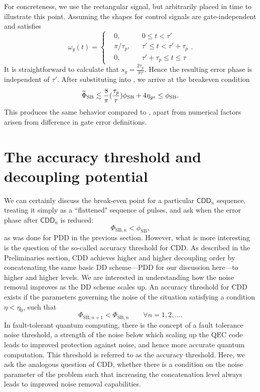 \documentclass[pra,reprint,superscriptaddress]{revtex4-2}
\newcommand{\wt}[1]{\widetilde{#1}}
\newcommand{\CDDn}{\mathsf{CDD}_n}
\begin{document}
For concreteness, we use the rectangular signal, but arbitrarily placed in time to illustrate this point. Assuming the shapes for control signals are gate-independent and satisfies
\begin{equation}
 \omega_g(t)=
 \left\{
 \begin{aligned}
  &0,&& 0\le t<\tau'\\
 &\pi/\tau_p, && \tau'\le t < \tau'+\tau_p\\
 & 0,&& \tau'+\tau_p \le t\le \tau
 \end{aligned}
 \right..
\end{equation}
It is straightforward to calculate that $s_g = \frac{2\tau_p}{\pi\tau}$.
Hence the resulting error phase is independent of $\tau'$.
After substituting into , we arrive at the breakeven condition
\begin{equation}\label{eq:PDD-rect2}
  \wt\Phi_{\rSB}\lesssim \frac{8}{\pi} (\frac{\tau_p}{\tau})\phi_\rSB +  
  4\eta_{ge}\le\phi_\rSB.
\end{equation}
This produces the same behavior compared to , apart 
from numerical factors arisen from difference in gate error definitions. 


\section{The accuracy threshold and decoupling potential}\label{sec:threshold}
We can certainly discuss the break-even point for a particular $\CDDn$ sequence, treating it simply as a ``flattened" sequence of pulses, and ask when the error phase after $\CDDn$ is reduced:
\begin{equation}
 \Phi_{\mathrm{SB},n} < \phi_{\mathrm{SB}},
\end{equation}
 as was done for PDD in the previous section. 
However, what is more interesting is the question of the so-called accuracy threshold for CDD.
As described in the Preliminaries section, CDD achieves higher and higher decoupling order by concatenating the same basic DD scheme---PDD for our discussion here---to higher and higher levels. 
We are interested in understanding how the noise removal improves as the DD scheme scales up.  An accuracy threshold for CDD exists if the parameters governing the noise of the situation satisfying a condition $\eta<\eta_0$, such that 
\begin{equation}\label{eq:thresCond}
\Phi_{\mathrm{SB},n+1} < \Phi_{\mathrm{SB},n}\qquad\forall n=1,2,\ldots.
\end{equation}
In fault-tolerant quantum computing, there is the concept of a fault tolerance noise threshold, a strength of the noise below which scaling up the QEC code leads to improved protection against noise, and hence more accurate quantum computation. This threshold is referred to as the accuracy threshold. Here, we ask the analogous question of CDD, whether there is a condition on the noise parameter of the problem such that increasing the concatenation level always leads to improved noise removal capabilities. 
%
\end{document}
